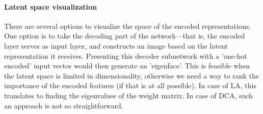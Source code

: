 \paragraph{Latent space visualization} There are several options to visualize the space of the encoded representations. One option is to take the decoding part of the network---that is, the encoded layer serves as input layer, and constructs an image based on the latent representation it receives. Presenting this decoder subnetwork with a 'one-hot encoded' input vector would then generate an 'eigenface'. This is feasible when the latent space is limited in dimensionality, otherwise we need a way to rank the importance of the encoded features (if that is at all possible). In case of LA, this translates to finding the eigenvalues of the weight matrix. In case of DCA, such an approach is not so straightforward.
